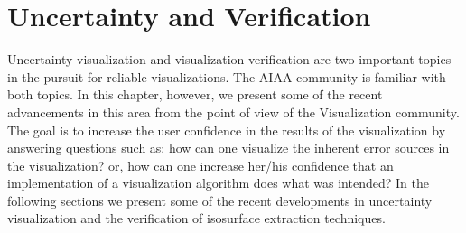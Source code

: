 


\section{Uncertainty and Verification}
\label{sec:verif}

Uncertainty visualization  and  visualization verification  are two important topics in the pursuit for reliable visualizations. 
The AIAA community is  familiar with both topics. In this chapter, however, we present some of the recent advancements in this area from the point of view of the Visualization community. The goal is to increase the user confidence in the results of the visualization by answering questions such as: how can one visualize the inherent error sources in the visualization? or, how can one increase her/his confidence that an implementation of a visualization algorithm  does what was intended? In the following sections we present some of the recent developments in uncertainty visualization and the verification of isosurface extraction techniques.


